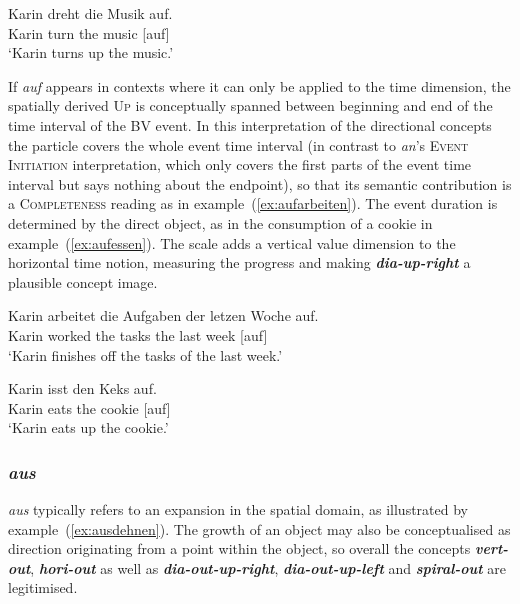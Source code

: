 \documentclass[output=paper]{langsci/langscibook}
\newcommand{\textci}[1]{\textit{\textbf{#1}}}
\begin{document}
\ea\label{ex:aufdrehen}
\gll Karin dreht die Musik auf.\\
Karin turn the music [auf]\\
\glt `Karin turns up the music.'
\z

If \textit{auf} appears in contexts where it can only be applied to
the time dimension, the spatially derived \textsc{Up} is conceptually
spanned between beginning and end of the time interval of the BV
event. In this interpretation of the directional concepts the particle
covers the whole event time interval (in contrast to \textit{an}'s
\textsc{Event Initiation} interpretation, which only covers the first
parts of the event time interval but says nothing about the endpoint),
so that its semantic contribution is a \textsc{Completeness} reading
as in example~(\ref{ex:aufarbeiten}). The event duration is determined
by the direct object, as in the consumption of a cookie in
example~(\ref{ex:aufessen}). The scale adds a vertical value dimension
to the horizontal time notion, measuring the progress and making
\textci{dia-up-right} a plausible concept image.

\ea\label{ex:aufarbeiten}
\gll Karin arbeitet die Aufgaben der letzen Woche auf.\\
Karin worked the tasks the last week [auf]\\
\glt `Karin finishes off the tasks of the last week.'
\z

\ea\label{ex:aufessen}
\gll Karin isst den Keks auf.\\
Karin eats the cookie [auf]\\
\glt `Karin eats up the cookie.'
\z


\vspace{+1mm}
\subsubsection{\textit{aus}}

\textit{aus} typically refers to an expansion in the spatial domain,
as illustrated by example~(\ref{ex:ausdehnen}). The growth of an
object may also be conceptualised as direction originating from a
point within the object, so overall the concepts \textci{vert-out},
\textci{hori-out} as well as \textci{dia-out-up-right},
\textci{dia-out-up-left} and \textci{spiral-out} are legitimised.
\end{document}

